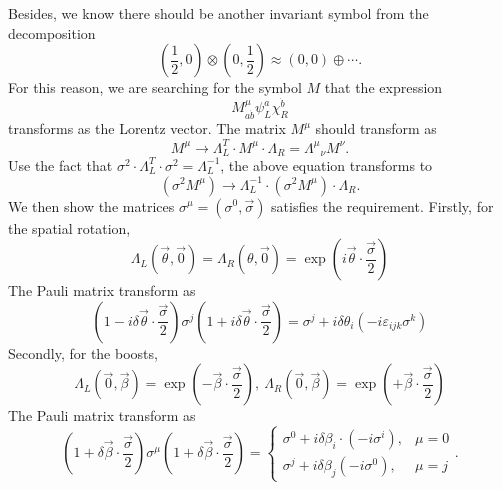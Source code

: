 Besides, we know there should be another invariant symbol from the decomposition
\begin{equation*}
	\left(\frac{1}{2}, 0\right) \otimes \left(0,\frac{1}{2}\right)
	\approx \left(0, 0\right) \oplus \cdots.
\end{equation*}
For this reason, we are searching for the symbol $M$ that the expression
\begin{equation*}
	M^\mu_{a\dot b} \psi^a_L \chi^{\dot b}_R
\end{equation*}
transforms as the Lorentz vector.
The matrix $M^\mu$ should transform as
\begin{equation*}
	M^\mu \longrightarrow \Lambda_L^T \cdot M^\mu \cdot \Lambda_R = {\Lambda^\mu}_\nu M^\nu.
\end{equation*}
Use the fact that $\sigma^2 \cdot \Lambda_L^T \cdot \sigma^2 = \Lambda_L^{-1}$, the above equation transforms to
\begin{equation*}
	\left(\sigma^2 M^\mu\right) \longrightarrow \Lambda_L^{-1} \cdot \left(\sigma^2 M^\mu\right)\cdot \Lambda_R.
\end{equation*}
We then show the matrices $\sigma^\mu = (\sigma^0,\vec\sigma)$ satisfies the requirement.
Firstly, for the spatial rotation,
\begin{equation*}
	\Lambda_L(\vec\theta,\vec 0) = \Lambda_R(\theta,\vec 0) = \exp\left(i\vec\theta\cdot \frac{\vec\sigma}{2}\right)
\end{equation*}
The Pauli matrix transform as
\begin{equation*}
	\left(1-i\delta\vec\theta\cdot\frac{\vec\sigma}{2}\right)\sigma^j\left(1+i\delta\vec\theta\cdot \frac{\vec\sigma}{2}\right)
	= \sigma^j + i\delta\theta_i \left(-i \varepsilon_{ijk}\sigma^k \right)
\end{equation*}
Secondly, for the boosts,
\begin{equation*}
	\Lambda_L(\vec 0, \vec\beta) = \exp\left(-\vec\beta\cdot \frac{\vec\sigma}{2}\right),\ 
	\Lambda_R(\vec 0, \vec\beta) = \exp\left(+\vec\beta\cdot \frac{\vec\sigma}{2}\right)
\end{equation*}
The Pauli matrix transform as
\begin{equation*}
	\left(1+\delta\vec\beta\cdot\frac{\vec\sigma}{2}\right)\sigma^\mu \left(1+\delta\vec\beta\cdot \frac{\vec\sigma}{2}\right) = \begin{cases}
		 \sigma^0 + i\delta\beta_i \cdot (-i\sigma^i), & \mu = 0 \\
		 \sigma^j + i\delta\beta_j (-i\sigma^0), & \mu = j
	\end{cases}.
\end{equation*}

